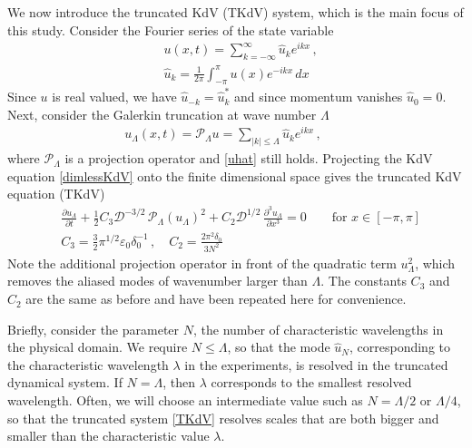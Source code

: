 \documentclass[11pt]{article}
\newcommand{\pd}[2]    { \frac{\partial #1} {\partial #2} }
\newcommand{\abs}[1]{\left| #1 \right|}
\newcommand{\eps}{\varepsilon}
\newcommand{\dx}{\, dx}
\newcommand{\lam}{\lambda}
\newcommand{\lamfac}{N}
\newcommand{\drat}{\mathcal{D}}
\newcommand{\epsup}{\eps_0}
\newcommand{\delup}{\delta_0}
\newcommand{\uhat}{\hat{u}}
\newcommand{\Proj}{\mathcal{P}_{\Lambda}}
\newcommand{\uL}{u_{\Lambda}}
\begin{document}
We now introduce the truncated KdV (TKdV) system, which is the main focus of this study. Consider the Fourier series of the state variable
\begin{align}
&u(x,t) = \sum_{k=-\infty}^{\infty} \uhat_k e^{i k x} \, , \\
\label{uhat}
&\uhat_k = \frac{1}{2 \pi} \int_{-\pi}^{\pi} u(x) e^{-i k x} \dx
\end{align}
Since $u$ is real valued, we have $\uhat_{-k} = \uhat_{k}^*$ and since momentum vanishes $\uhat_0 = 0$.
Next, consider the Galerkin truncation at wave number $\Lambda$
\begin{align}
\uL(x,t) = \Proj u =
\sum_{\abs{k} \le \Lambda} \uhat_k e^{i k x} \, , \qquad
\end{align}
where $\Proj$ is a projection operator and \eqref{uhat} still holds. Projecting the KdV equation \eqref{dimlessKdV} onto the finite dimensional space gives the truncated KdV equation (TKdV)
\begin{align}
\label{TKdV}
&\pd{\uL}{t} +  \frac{1}{2} C_3 \drat^{-3/2} \,\Proj (\uL)^2 + C_2 \drat^{1/2} \, \frac{\partial^3 \uL}{\partial x^3} = 0
\qquad \text{for } x \in [-\pi,\pi] \\
&C_3 = \frac{3}{2} \pi^{1/2} \epsup \delup^{-1} \, , \quad
C_2 = \frac{2 \pi^2 \delup}{3 \lamfac^2}
\end{align}
Note the additional projection operator in front of the quadratic term $\uL^2$, which removes the aliased modes of wavenumber larger than $\Lambda$. The constants $C_3$ and $C_2$ are the same as before and have been repeated here for convenience. 

Briefly, consider the parameter $\lamfac$, the number of characteristic wavelengths in the physical domain. We require $\lamfac \le \Lambda$, so that the mode $\uhat_{\lamfac}$, corresponding to the characteristic wavelength $\lam$ in the experiments, is resolved in the truncated dynamical system. If $\lamfac = \Lambda$, then $\lam$ corresponds to the smallest resolved wavelength. Often, we will choose an intermediate value such as $\lamfac = \Lambda/2$ or $\Lambda/4$, so that the truncated system \eqref{TKdV} resolves scales that are both bigger and smaller than the characteristic value $\lam$.
\end{document}
